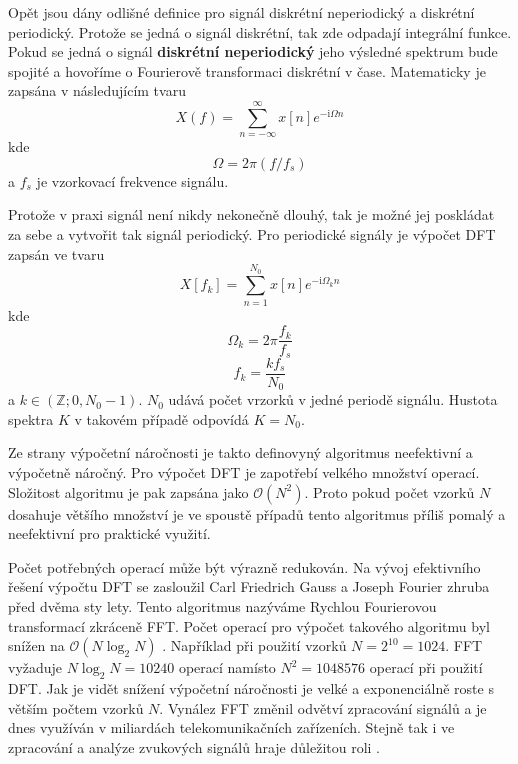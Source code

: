   Opět jsou dány odlišné definice pro signál diskrétní neperiodický a diskrétní periodický. Protože se jedná o signál diskrétní, tak zde odpadají integrální funkce.
  Pokud se jedná o signál \textbf{diskrétní neperiodický} jeho výsledné spektrum bude spojité a hovoříme o Fourierově transformaci diskrétní v čase. Matematicky je zapsána v následujícím tvaru
  \begin{equation}
    X(f) = \sum_{n = -\infty}^{\infty} x[n] e^{-\mathrm{i} \Omega n}
    \label{rov:DTFT}
  \end{equation}
  kde
  \begin{equation}
    \Omega = 2 \pi (f/f_s)
  \end{equation}
  a $f_s$ je vzorkovací frekvence signálu.

  Protože v praxi signál není nikdy nekonečně dlouhý, tak je možné jej poskládat za sebe a vytvořit tak signál periodický. Pro periodické signály je výpočet \acs{DFT} zapsán ve tvaru
  \begin{equation}
    X[f_k] = \sum_{n = 1}^{N_0} x[n] e^{-\mathrm{i}\Omega_k n}
    \label{rov:DFT}
  \end{equation}
  kde
  \begin{equation}
    \Omega_k = 2 \pi \frac{f_k}{f_s}
  \end{equation}
  \begin{equation}
    f_k = \frac{k f_s}{N_0}
  \end{equation}
  a $k \in(\mathbb{Z}; 0, N_0 -1)$. $N_0$ udává počet vrzorků v jedné periodě signálu.
  Hustota spektra $K$ v takovém případě odpovídá $K = N_0$.

  Ze strany výpočetní náročnosti je takto definovyný algoritmus neefektivní a výpočetně náročný.
  Pro výpočet \acs{DFT} je zapotřebí velkého množství operací. Složitost algoritmu je pak zapsána jako $\mathcal{O}(N^2)$.
  Proto pokud počet vzorků $N$ dosahuje většího množství je ve spoustě případů tento algoritmus příliš pomalý a neefektivní pro praktické využití.

  Počet potřebných operací může být výrazně redukován. 
  Na vývoj efektivního řešení výpočtu \acs{DFT} se zasloužil Carl Friedrich Gauss a Joseph Fourier zhruba před dvěma sty lety. Tento algoritmus nazýváme Rychlou Fourierovou transformací zkráceně FFT.
  Počet operací pro výpočet takového algoritmu byl snížen na $\mathcal{O}(N \log_2 N)$ \cite{fundamental_of_music_processing}.
  Například při použití vzorků $N = 2^{10} = 1024$. \acs{FFT} vyžaduje $N\log_2N = 10240 $ operací namísto $N^2 = 1048576$ operací při použití \acs{DFT}. Jak je vidět snížení výpočetní náročnosti je velké a exponenciálně roste s větším počtem vzorků $N$.
  Vynález \acs{FFT} změnil odvětví zpracování signálů a je dnes využíván v miliardách telekomunikačních zařízeních. Stejně tak i ve zpracování a analýze zvukových signálů hraje důležitou roli \cite{fundamental_of_music_processing}.


